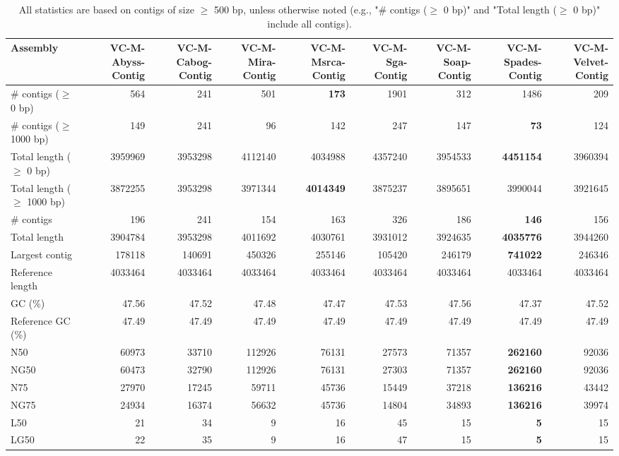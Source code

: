 \documentclass[12pt,a4paper]{article}
\begin{document}
\begin{table}[ht]
\begin{center}
\caption{All statistics are based on contigs of size $\geq$ 500 bp, unless otherwise noted (e.g., "\# contigs ($\geq$ 0 bp)" and "Total length ($\geq$ 0 bp)" include all contigs).}
\begin{tabular}{|l*{8}{|r}|}
\hline
Assembly & VC-M-Abyss-Contig & VC-M-Cabog-Contig & VC-M-Mira-Contig & VC-M-Msrca-Contig & VC-M-Sga-Contig & VC-M-Soap-Contig & VC-M-Spades-Contig & VC-M-Velvet-Contig \\ \hline
\# contigs ($\geq$ 0 bp) & 564 & 241 & 501 & {\bf 173} & 1901 & 312 & 1486 & 209 \\ \hline
\# contigs ($\geq$ 1000 bp) & 149 & 241 & 96 & 142 & 247 & 147 & {\bf 73} & 124 \\ \hline
Total length ($\geq$ 0 bp) & 3959969 & 3953298 & 4112140 & 4034988 & 4357240 & 3954533 & {\bf 4451154} & 3960394 \\ \hline
Total length ($\geq$ 1000 bp) & 3872255 & 3953298 & 3971344 & {\bf 4014349} & 3875237 & 3895651 & 3990044 & 3921645 \\ \hline
\# contigs & 196 & 241 & 154 & 163 & 326 & 186 & {\bf 146} & 156 \\ \hline
Total length & 3904784 & 3953298 & 4011692 & 4030761 & 3931012 & 3924635 & {\bf 4035776} & 3944260 \\ \hline
Largest contig & 178118 & 140691 & 450326 & 255146 & 105420 & 246179 & {\bf 741022} & 246346 \\ \hline
Reference length & 4033464 & 4033464 & 4033464 & 4033464 & 4033464 & 4033464 & 4033464 & 4033464 \\ \hline
GC (\%) & 47.56 & 47.52 & 47.48 & 47.47 & 47.53 & 47.56 & 47.37 & 47.52 \\ \hline
Reference GC (\%) & 47.49 & 47.49 & 47.49 & 47.49 & 47.49 & 47.49 & 47.49 & 47.49 \\ \hline
N50 & 60973 & 33710 & 112926 & 76131 & 27573 & 71357 & {\bf 262160} & 92036 \\ \hline
NG50 & 60473 & 32790 & 112926 & 76131 & 27303 & 71357 & {\bf 262160} & 92036 \\ \hline
N75 & 27970 & 17245 & 59711 & 45736 & 15449 & 37218 & {\bf 136216} & 43442 \\ \hline
NG75 & 24934 & 16374 & 56632 & 45736 & 14804 & 34893 & {\bf 136216} & 39974 \\ \hline
L50 & 21 & 34 & 9 & 16 & 45 & 15 & {\bf 5} & 15 \\ \hline
LG50 & 22 & 35 & 9 & 16 & 47 & 15 & {\bf 5} & 15 \\ \hline

\end{tabular}
\end{center}
\end{table}
\end{document}
